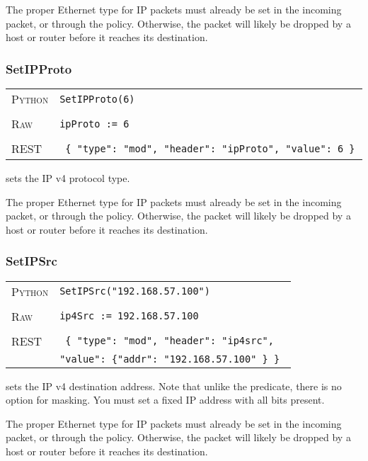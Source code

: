 The proper Ethernet type for IP packets must already be set in the incoming packet, or through the 
 policy.  Otherwise, the packet will likely be dropped by a host or router before it 
reaches its destination.

\subsubsection{SetIPProto}

\bigskip
\begin{tabularx}{\linewidth}{lX}
\textsc{Python}   & \texttt{SetIPProto(6)} \\ \\
\textsc{Raw}    & \texttt{ipProto := 6}     \\ \\
\textsc{REST} & \texttt{ \{ "type": "mod", "header": "ipProto", "value": 6 \} }
\end{tabularx}

 sets the IP v4 protocol type.      

The proper Ethernet type for IP packets must already be set in the incoming packet, or through the 
 policy.  Otherwise, the packet will likely be dropped by a host or router before it 
reaches its destination.

\subsubsection{SetIPSrc}

\bigskip
\begin{tabularx}{\linewidth}{lX}
\textsc{Python}   & \texttt{SetIPSrc("192.168.57.100")} \\ \\
\textsc{Raw}    & \texttt{ip4Src := 192.168.57.100}     \\ \\
\textsc{REST} & \texttt{ \{ "type": "mod", "header": "ip4src", } \\
  & \texttt{"value": \{"addr": "192.168.57.100" \} \} }
\end{tabularx}

 sets the IP v4 destination address.  Note that unlike the  predicate,
there is no option for masking.  You must set a fixed IP address with all bits present.    

The proper Ethernet type for IP packets must already be set in the incoming packet, or through the 
 policy.  Otherwise, the packet will likely be dropped by a host or router before it 
reaches its destination.

